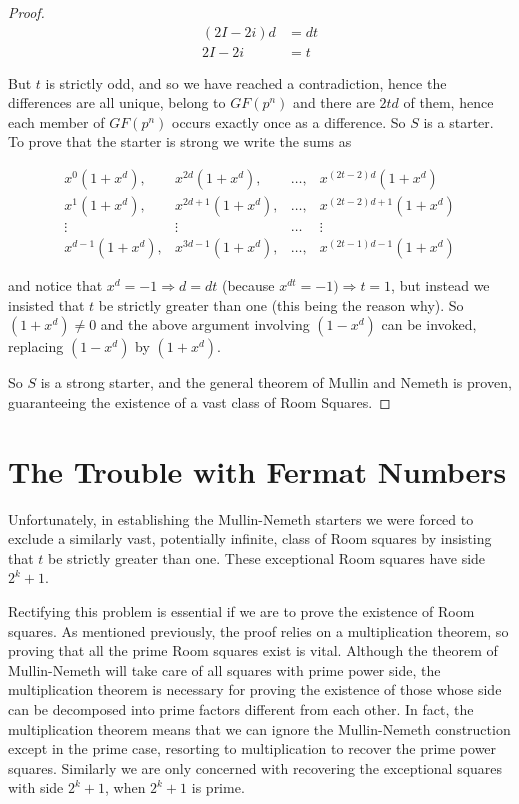 \documentclass[11pt, a4paper]{book}\usepackage[]{graphicx}\usepackage[]{xcolor}
\begin{document}
\begin{proof}
\begin{eqnarray*}
  (2I - 2i)d &= dt \\
  2I - 2i &= t
\end{eqnarray*}

But $t$ is strictly odd, and so we have reached a
contradiction, hence the differences are all unique, belong
to $GF(p^n)$ and there are $2td$ of them, hence each member
of $GF(p^n)$ occurs exactly once as a difference. So $S$ is
a starter. To prove that the starter is strong we write the
sums as

\begin{equation*}
  \begin{array}{cccc}
    x^0(1 + x^d), & x^{2d}(1 + x^d), & \ldots, & x^{(2t - 2)d}(1 + x^d) \\
    x^1(1 + x^d), & x^{2d + 1}(1 + x^d), & \ldots, & x^{(2t - 2)d + 1}(1 + x^d) \\
    \vdots & \vdots & \ldots & \vdots \\
    x^{d - 1}(1 + x^d), & x^{3d - 1}(1 + x^d), & \ldots, & x^{(2t - 1)d - 1}(1 + x^d)
  \end{array}
\end{equation*}

and notice that $x^d = -1 \Rightarrow d = dt$ (because
$x^{dt} = -1) \Rightarrow t = 1$, but instead we insisted that
$t$ be strictly greater than one (this being the reason
why). So $(1 + x^d) \neq 0$ and the above argument
involving $(1 - x^d)$ can be invoked, replacing
$(1 - x^d)$ by $(1 + x^d)$.

So $S$ is a strong starter, and the general theorem of
Mullin and Nemeth is proven, guaranteeing the existence of a
vast class of Room Squares.
\end{proof}

\section{The Trouble with Fermat Numbers}

Unfortunately, in establishing the Mullin-Nemeth starters
we were forced to exclude a similarly vast, potentially
infinite, class of Room squares by insisting that $t$ be
strictly greater than one. These exceptional Room squares
have side $2^k + 1$.

Rectifying this problem is essential if we are to prove the
existence of Room squares. As mentioned previously, the
proof relies on a multiplication theorem, so proving that
all the prime Room squares exist is vital. Although the
theorem of Mullin-Nemeth will take care of all squares
with prime power side, the multiplication theorem is
necessary for proving the existence of those whose side can
be decomposed into prime factors different from each other.
In fact, the multiplication theorem means that we can ignore
the Mullin-Nemeth construction except in the prime case,
resorting to multiplication to recover the prime power
squares. Similarly we are only concerned with recovering the
exceptional squares with side $2^k + 1$, when $2^k + 1$ is
prime.
\end{document}

